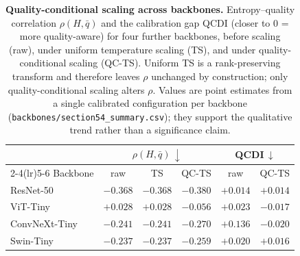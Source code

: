\begin{table}[t]
\centering
\caption{
\textbf{Quality-conditional scaling across backbones.}
Entropy--quality correlation $\rho(H,\bar q)$ and the calibration gap QCDI (closer to $0$ = more
quality-aware) for four further backbones, before scaling (raw), under uniform temperature scaling
(TS), and under quality-conditional scaling (QC-TS). Uniform TS is a rank-preserving transform and
therefore leaves $\rho$ unchanged by construction; only quality-conditional scaling alters $\rho$.
Values are point estimates from a single calibrated configuration per backbone
(\texttt{backbones/section54\_summary.csv}); they support the qualitative trend rather than a
significance claim.
}
\label{tab:universality}
\footnotesize
\setlength{\tabcolsep}{5pt}
\renewcommand{\arraystretch}{1.05}
\begin{tabular}{l ccc cc}
\toprule
& \multicolumn{3}{c}{$\rho(H,\bar q)\,\downarrow$} & \multicolumn{2}{c}{QCDI$\,\downarrow$} \\
\cmidrule(lr){2-4}\cmidrule(lr){5-6}
Backbone & raw & TS & QC-TS & raw & QC-TS \\
\midrule
ResNet-50      & $-0.368$ & $-0.368$ & $\mathbf{-0.380}$ & $+0.014$ & $+0.014$ \\
ViT-Tiny       & $+0.028$ & $+0.028$ & $\mathbf{-0.056}$ & $+0.023$ & $-0.017$ \\
ConvNeXt-Tiny  & $-0.241$ & $-0.241$ & $\mathbf{-0.270}$ & $+0.136$ & $-0.020$ \\
Swin-Tiny      & $-0.237$ & $-0.237$ & $\mathbf{-0.259}$ & $+0.020$ & $+0.016$ \\
\bottomrule
\end{tabular}
\vspace{-4pt}
\end{table}
